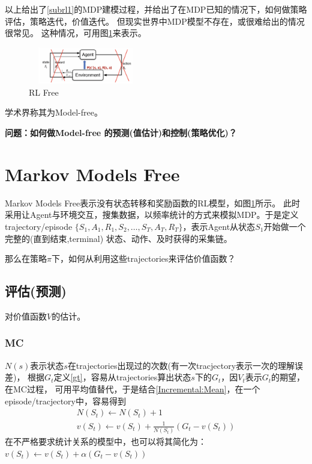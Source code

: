 \documentclass[UTF8]{ctexart}
\begin{document}
 以上给出了\ref{subrl1}的MDP建模过程，并给出了在MDP已知的情况下，如何做策略评估，策略迭代，价值迭代。
 但现实世界中MDP模型不存在，或很难给出的情况很常见。
这种情况，可用图\ref{subrl2}来表示。
 \begin{figure}[htbp]
	\centering
	\includegraphics[width=5cm, height=1.6cm]{./pic/rl_free.png}
    \caption{RL Free}
    \label{subrl2}
\end{figure}
学术界称其为Model-free。

\textbf{问题：如何做Model-free 的预测(值估计)和控制(策略优化)？}


\section{Markov Models Free}

Markov Models Free表示没有状态转移和奖励函数的RL模型，如图\ref{subrl2}所示。
此时采用让Agent与环境交互，搜集数据，以频率统计的方式来模拟MDP。于是定义trajectory/episode
$\{S_1, A_1, R_1, S_2, \ldots, S_T, A_T, R_T\}$，表示Agent从状态$S_1$开始做一个完整的(直到结束,terminal)
状态、动作、及时获得的采集链。

那么在策略$\pi$下，如何从利用这些trajectories来评估价值函数？

\subsection{评估(预测)}
对价值函数$V$的估计。
\subsubsection{MC}
$N(s)$表示状态$s$在trajectories出现过的次数(有一次tracjectory表示一次的理解误差)，
根据$G_t$定义\eqref{gt}，容易从trajectories算出状态$s$下的$G_t$，因$V_t$表示$G_t$的期望，在MC过程，
可用平均值替代，于是结合\eqref{Incremental:Mean}，在一个episode/tracjectory中，容易得到
$$\begin{array}{l}
    N\left(S_{t}\right) \leftarrow N\left(S_{t}\right)+1 \\
    v\left(S_{t}\right) \leftarrow v\left(S_{t}\right)+\frac{1}{N\left(S_{t}\right)}\left(G_{t}-v\left(S_{t}\right)\right)
    \end{array}
$$
在不严格要求统计关系的模型中，也可以将其简化为：
$v\left(S_{t}\right) \leftarrow v\left(S_{t}\right)+\alpha \left(G_{t}-v\left(S_{t}\right)\right)$
\end{document}
